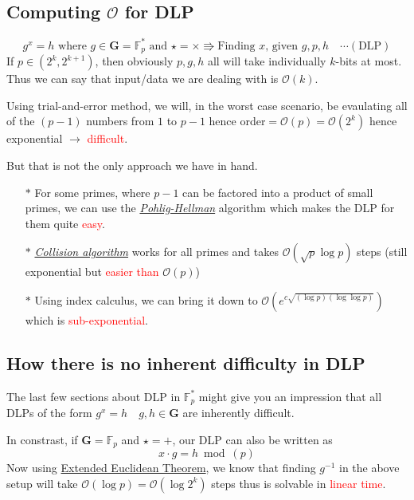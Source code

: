 		\subsection{Computing \(\mathcal{O}\) for DLP}
			\[g^x=h \text{ where }g\in\mathbf{G}=\mathbb{F}_{p}^{\ast} \text{ and } \star= \times \Rrightarrow \text{Finding \(x\), given \(g, p, h\)} \quad \cdots (\text{DLP})\]
			If \(p \in (2^k, 2^{k+1})\), then obviously \(p, g, h\) all will take individually \(k\)-bits at most. Thus we can say that input/data we are dealing with is \(\mathcal{O}(k)\).\par
			Using trial-and-error method, we will, in the worst case scenario, be evaulating all of the \((p-1)\) numbers from \(1\) to \(p-1\) hence order\( =\mathcal{O}(p)= \mathcal{O}(2^k)\) hence exponential \(\rightarrow\) \textcolor{red}{difficult}.\par
			But that is not the only approach we have in hand.
			\begin{itemize}
				\item[\(\ast\)] For some primes, where \(p-1\) can be factored into a product of small primes, we can use the \hyperref[sec:pohlig]{\emph{Pohlig-Hellman}} algorithm which makes the DLP for them quite \textcolor{red}{easy}.
				\item[\(\ast\)] \hyperref[sec:colli]{\emph{Collision algorithm}} works for all primes and takes \(\mathcal{O}(\sqrt{p} \log p)\) steps (still exponential but \textcolor{red}{easier than} \(\mathcal{O}(p)\))
				\item[\(\ast\)] Using index calculus, we can bring it down to \(\mathcal{O}(e^{c\sqrt{(\log p)( \log\log p )}})\) which is \textcolor{red}{sub-exponential}.
			\end{itemize}

		\subsection{How there is no inherent difficulty in DLP}
			The last few sections about DLP in \(\mathbb{F}_p^*\) might give you an impression that all DLPs of the form \(g^x = h \quad g, h\in \mathbf{G}\) are inherently difficult. \par
			In constrast, if \(\mathbf{G}=\mathbb{F}_p\) and \(\star = +\), our DLP can also be written as \[x \cdot g = h \bmod(p)\]
			Now using \hyperref[theo:extendedEuclid]{Extended Euclidean Theorem}, we know that finding \(g^{-1}\) in the above setup will take \(\mathcal{O}(\log p) = \mathcal{O}(\log 2^k)\) steps thus is solvable in \textcolor{red}{linear time}.


